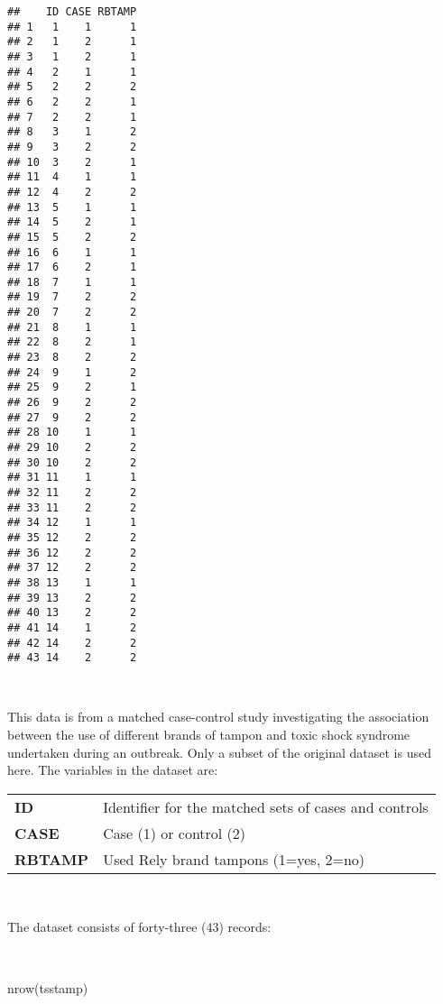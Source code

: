 \documentclass[
  12pt,
  a4paper]{book}
\newenvironment{Shaded}{\begin{snugshade}}{\end{snugshade}}
\newcommand{\FunctionTok}[1]{\textcolor[rgb]{0.00,0.00,0.00}{#1}}
\newcommand{\NormalTok}[1]{#1}
\begin{document}
\begin{verbatim}
##    ID CASE RBTAMP
## 1   1    1      1
## 2   1    2      1
## 3   1    2      1
## 4   2    1      1
## 5   2    2      2
## 6   2    2      1
## 7   2    2      1
## 8   3    1      2
## 9   3    2      2
## 10  3    2      1
## 11  4    1      1
## 12  4    2      2
## 13  5    1      1
## 14  5    2      1
## 15  5    2      2
## 16  6    1      1
## 17  6    2      1
## 18  7    1      1
## 19  7    2      2
## 20  7    2      2
## 21  8    1      1
## 22  8    2      1
## 23  8    2      2
## 24  9    1      2
## 25  9    2      1
## 26  9    2      2
## 27  9    2      2
## 28 10    1      1
## 29 10    2      2
## 30 10    2      2
## 31 11    1      1
## 32 11    2      2
## 33 11    2      2
## 34 12    1      1
## 35 12    2      2
## 36 12    2      2
## 37 12    2      2
## 38 13    1      1
## 39 13    2      2
## 40 13    2      2
## 41 14    1      2
## 42 14    2      2
## 43 14    2      2
\end{verbatim}

~

This data is from a matched case-control study investigating the association between the use of different brands of tampon and toxic shock syndrome undertaken during an outbreak. Only a subset of the original dataset is used here. The variables in the dataset are:

\newpage

\begin{longtable}[]{@{}
  >{\raggedright\arraybackslash}p{}
  >{\raggedright\arraybackslash}p{}@{}}
\toprule
\endhead
\textbf{ID} & Identifier for the matched sets of cases and controls \\
\textbf{CASE} & Case (1) or control (2) \\
\textbf{RBTAMP} & Used Rely brand tampons (1=yes, 2=no) \\
\bottomrule
\end{longtable}

~

The dataset consists of forty-three (43) records:

~

\begin{Shaded}
\begin{Highlighting}[]
\FunctionTok{nrow}\NormalTok{(tsstamp)}
\end{Highlighting}
\end{Shaded}
\end{document}
